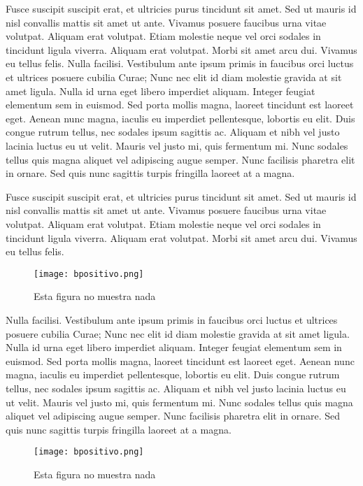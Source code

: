 \documentclass[twocolumn,a4paper,10pt]{article}
\begin{document}
Fusce suscipit suscipit erat, et ultricies purus tincidunt sit amet. Sed ut mauris id nisl convallis mattis sit amet ut ante. Vivamus posuere faucibus urna vitae volutpat. Aliquam erat volutpat. Etiam molestie neque vel orci sodales in tincidunt ligula viverra. Aliquam erat volutpat. Morbi sit amet arcu dui. Vivamus eu tellus felis.
Nulla facilisi. Vestibulum ante ipsum primis in faucibus orci luctus et ultrices posuere cubilia Curae; Nunc nec elit id diam molestie gravida at sit amet ligula. Nulla id urna eget libero imperdiet aliquam. Integer feugiat elementum sem in euismod. Sed porta mollis magna, laoreet tincidunt est laoreet eget. Aenean nunc magna, iaculis eu imperdiet pellentesque, lobortis eu elit. Duis congue rutrum tellus, nec sodales ipsum sagittis ac. Aliquam et nibh vel justo lacinia luctus eu ut velit. Mauris vel justo mi, quis fermentum mi. Nunc sodales tellus quis magna aliquet vel adipiscing augue semper. Nunc facilisis pharetra elit in ornare. Sed quis nunc sagittis turpis fringilla laoreet at a magna.

Fusce suscipit suscipit erat, et ultricies purus tincidunt sit amet. Sed ut mauris id nisl convallis mattis sit amet ut ante. Vivamus posuere faucibus urna vitae volutpat. Aliquam erat volutpat. Etiam molestie neque vel orci sodales in tincidunt ligula viverra. Aliquam erat volutpat. Morbi sit amet arcu dui. Vivamus eu tellus felis.

\begin{figure}
    \center \texttt{[image: bpositivo.png]}
    \caption{Esta figura no muestra nada}
\end{figure}

Nulla facilisi. Vestibulum ante ipsum primis in faucibus orci luctus et ultrices posuere cubilia Curae; Nunc nec elit id diam molestie gravida at sit amet ligula. Nulla id urna eget libero imperdiet aliquam. Integer feugiat elementum sem in euismod. Sed porta mollis magna, laoreet tincidunt est laoreet eget. Aenean nunc magna, iaculis eu imperdiet pellentesque, lobortis eu elit. Duis congue rutrum tellus, nec sodales ipsum sagittis ac. Aliquam et nibh vel justo lacinia luctus eu ut velit. Mauris vel justo mi, quis fermentum mi. Nunc sodales tellus quis magna aliquet vel adipiscing augue semper. Nunc facilisis pharetra elit in ornare. Sed quis nunc sagittis turpis fringilla laoreet at a magna.
\begin{figure}
    \center \texttt{[image: bpositivo.png]}
    \caption{Esta figura no muestra nada}
\end{figure}
\end{document}
